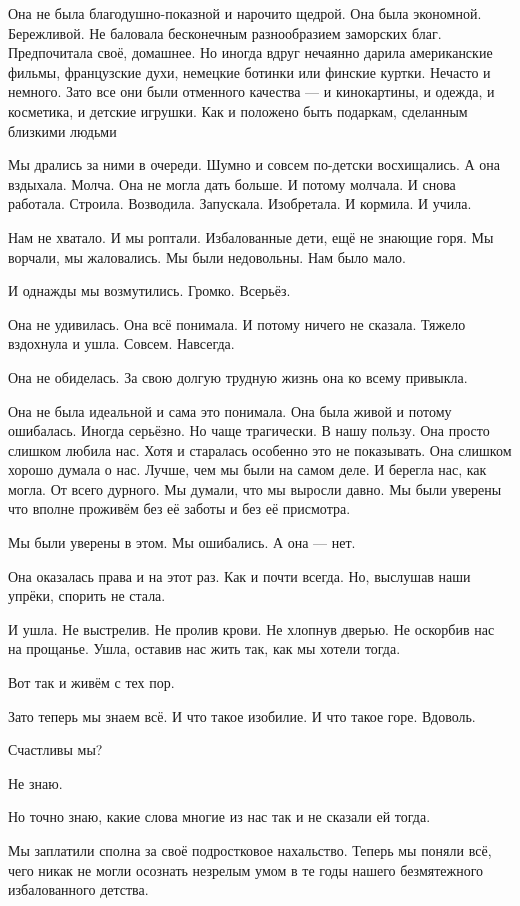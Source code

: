 \begin{itemize}
Она не была благодушно-показной и нарочито щедрой. Она была экономной.
Бережливой. Не баловала бесконечным разнообразием заморских благ. Предпочитала
своё, домашнее. Но иногда вдруг нечаянно дарила американские фильмы,
французские духи, немецкие ботинки или финские куртки. Нечасто и немного. Зато
все они были отменного качества — и кинокартины, и одежда, и косметика, и
детские игрушки. Как и положено быть подаркам, сделанным близкими людьми

Мы дрались за ними в очереди. Шумно и совсем по-детски восхищались. А она
вздыхала. Молча. Она не могла дать больше. И потому молчала. И снова работала.
Строила. Возводила. Запускала. Изобретала. И кормила. И учила.

Нам не хватало. И мы роптали. Избалованные дети, ещё не знающие горя. Мы
ворчали, мы жаловались. Мы были недовольны. Нам было мало.

И однажды мы возмутились. Громко. Всерьёз.

Она не удивилась. Она всё понимала. И потому ничего не сказала. Тяжело
вздохнула и ушла. Совсем. Навсегда.

Она не обиделась. За свою долгую трудную жизнь она ко всему привыкла.

Она не была идеальной и сама это понимала. Она была живой и потому ошибалась.
Иногда серьёзно. Но чаще трагически. В нашу пользу. Она просто слишком любила
нас. Хотя и старалась особенно это не показывать. Она слишком хорошо думала о
нас. Лучше, чем мы были на самом деле. И берегла нас, как могла. От всего
дурного. Мы думали, что мы выросли давно. Мы были уверены что вполне проживём
без её заботы и без её присмотра.

Мы были уверены в этом. Мы ошибались. А она — нет.

Она оказалась права и на этот раз. Как и почти всегда. Но, выслушав наши
упрёки, спорить не стала.

И ушла. Не выстрелив. Не пролив крови. Не хлопнув дверью. Не оскорбив нас на
прощанье. Ушла, оставив нас жить так, как мы хотели тогда.

Вот так и живём с тех пор.

Зато теперь мы знаем всё. И что такое изобилие. И что такое горе. Вдоволь.

Счастливы мы?

Не знаю.

Но точно знаю, какие слова многие из нас так и не сказали ей тогда.

Мы заплатили сполна за своё подростковое нахальство. Теперь мы поняли всё, чего
никак не могли осознать незрелым умом в те годы нашего безмятежного
избалованного детства.


\end{itemize}
